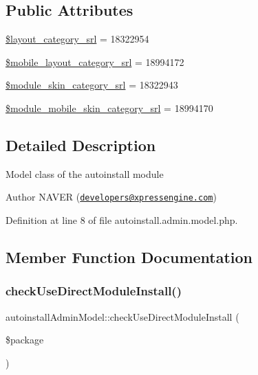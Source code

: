 \subsection*{Public Attributes}
\begin{DoxyCompactItemize}
\item 
\hyperlink{classautoinstallAdminModel_ae52a3948ebafbec737741c8bb5a51f68}{\$layout\+\_\+category\+\_\+srl} = 18322954
\item 
\hyperlink{classautoinstallAdminModel_a7dca62f2e0f3e37c6f2562125cd8cf94}{\$mobile\+\_\+layout\+\_\+category\+\_\+srl} = 18994172
\item 
\hyperlink{classautoinstallAdminModel_ad9e023f5b4f464ba2cbea5465d05ef69}{\$module\+\_\+skin\+\_\+category\+\_\+srl} = 18322943
\item 
\hyperlink{classautoinstallAdminModel_add26efaa0308b61db15daa951bef678f}{\$module\+\_\+mobile\+\_\+skin\+\_\+category\+\_\+srl} = 18994170
\end{DoxyCompactItemize}


\subsection{Detailed Description}
Model class of the autoinstall module \begin{DoxyAuthor}{Author}
N\+A\+V\+ER (\href{mailto:developers@xpressengine.com}{\tt developers@xpressengine.\+com}) 
\end{DoxyAuthor}


Definition at line 8 of file autoinstall.\+admin.\+model.\+php.



\subsection{Member Function Documentation}
\hypertarget{classautoinstallAdminModel_a899c3f3182e6c80b28f0aabc261bf38c}{}\label{classautoinstallAdminModel_a899c3f3182e6c80b28f0aabc261bf38c} 
\subsubsection{\texorpdfstring{check\+Use\+Direct\+Module\+Install()}{checkUseDirectModuleInstall()}}
{\footnotesize\ttfamily autoinstall\+Admin\+Model\+::check\+Use\+Direct\+Module\+Install (\begin{DoxyParamCaption}\item[{}]{\$package }\end{DoxyParamCaption})}



